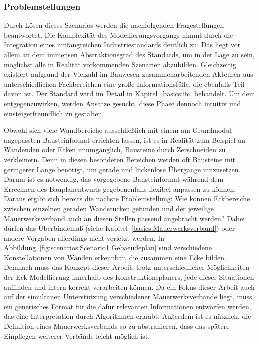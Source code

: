 \subsubsection*{Problemstellungen}
Durch Lösen dieses Szenarios werden die nachfolgenden Fragestellungen beantwortet.
Die Komplexität des Modellierungsvorgangs nimmt durch die Integration eines umfangreichen Industriestandards deutlich zu.
Das liegt vor allem an dem immensen Abstraktionsgrad des Standards, um in der Lage zu sein, möglichst alle in Realität vorkommenden Szenarien abzubilden.
Gleichzeitig existiert aufgrund der Vielzahl im Bauwesen zusammenarbeitenden Akteuren aus unterschiedlichen Fachbereichen eine große Informationsfülle, die ebenfalls Teil davon ist.
Der Standard wird im Detail in Kapitel~\ref{basics:ifc} behandelt.
Um dem entgegenzuwirken, werden Ansätze gesucht, diese Phase dennoch intuitiv und einsteigerfreundlich zu gestalten.

Obwohl sich viele Wandbereiche ausschließlich mit einem am Grundmodul angepassten Bausteinformat errichten lassen, ist es in Realität zum Beispiel an Wandenden oder Ecken unumgänglich, Bausteine durch Zerschneiden zu verkleinern.
Denn in diesen besonderen Bereichen werden oft Bausteine mit geringerer Länge benötigt, um gerade und lückenlose Übergange umzusetzen.
Darum ist es notwendig, das vorgegebene Bausteinformat während dem Errechnen des Bauplanentwurfs gegebenenfalls flexibel anpassen zu können.
Daraus ergibt sich bereits die nächste Problemstellung:
Wie können Eckbereiche zwischen einzelnen geraden Wandstücken gefunden und der jeweilige Mauerwerksverband auch an diesen Stellen passend angebracht werden?
Dabei dürfen das Überbindemaß (siehe Kapitel~\ref{basics:Mauerwerksverband}) oder andere Vorgaben allerdings nicht verletzt werden.
In Abbildung~\ref{fig:scenarios:Scenario1 Gebaeudeplan} sind verschiedene Konstellationen von Wänden erkennbar, die zusammen eine Ecke bilden.
Demnach muss das Konzept dieser Arbeit, trotz unterschiedlicher Möglichkeiten der Eck-Modellierung innerhalb des Konstruktionsplaners, jede dieser Situationen auffinden und intern korrekt verarbeiten können.
Da ein Fokus dieser Arbeit auch auf der simultanen Unterstützung verschiedener Mauerwerksverbände liegt, muss ein generisches Format für die dafür relevanten Informationen entworfen werden, das eine Interpretation durch Algorithmen erlaubt.
Außerdem ist es nützlich, die Definition eines Mauerwerksverbands so zu abstrahieren, dass das spätere Einpflegen weiterer Verbände leicht möglich ist.

